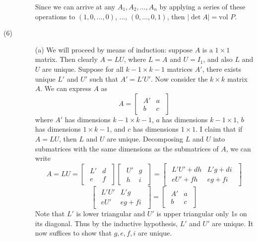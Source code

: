 \documentclass[openany]{book}
\begin{document}
\begin{description}
\begin{itemize}
Since we can arrive at any $A_1, A_2, ..., A_n$ by applying a series of these operations to $(1, 0, ..., 0)$, ..., $(0, ..., 0, 1)$, then $|\det A| = \text{vol }P$.
\end{itemize}
\item[(6)]
\begin{itemize}
\item[(a)]
We will proceed by means of induction: suppose $A$ is a $1 \times 1$ matrix. Then clearly $A = LU$, where $L = A$ and $U = I_1$, and also $L$ and $U$ are unique. Suppose for all $k - 1 \times k - 1$ matrices $A'$, there exists unique $L'$ and $U'$ such that $A' = L'U'$. Now consider the $k \times k$ matrix $A$. We can express $A$ as
$$A = \begin{bmatrix}
\begin{array}{c|c}
A' & a \\
\hline
b & c
\end{array}
\end{bmatrix}$$
where $A'$ has dimensions $k - 1 \times k - 1$, $a$ has dimensions $k - 1 \times 1$, $b$ has dimensions $1 \times k - 1$, and $c$ has dimensions $1 \times 1$. I claim that if $A = LU$, then $L$ and $U$ are unique. Decomposing $L$ and $U$ into submatrices with the same dimensions as the submatrices of $A$, we can write
$$A = LU = \begin{bmatrix}
\begin{array}{c|c}
L' & d \\
\hline
e & f
\end{array}
\end{bmatrix}\begin{bmatrix}
\begin{array}{c|c}
U' & g \\ 
\hline
h & i
\end{array}
\end{bmatrix} = \begin{bmatrix}
\begin{array}{c|c}
L'U' + dh & L'g + di \\
\hline
eU' + fh & eg + fi
\end{array}
\end{bmatrix}$$
$$\begin{bmatrix}
\begin{array}{c|c}
L'U' & L'g \\
\hline
eU' & eg + fi
\end{array}
\end{bmatrix} = \begin{bmatrix}
\begin{array}{c|c}
A' & a \\
\hline
b & c
\end{array}
\end{bmatrix}$$
Note that $L'$ is lower triangular and $U'$ is upper triangular only 1s on its diagonal. Thus by the inductive hypothesis, $L'$ and $U'$ are unique. It now suffices to show that $g, e, f, i$ are unique.


\end{itemize}
\end{description}
\end{document}
